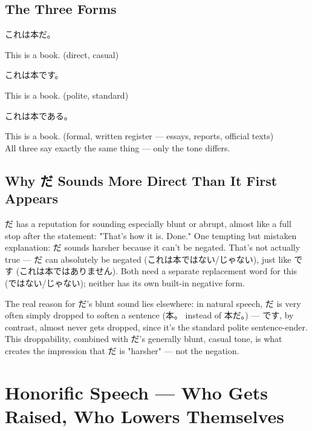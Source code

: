 \documentclass[12pt]{book}
\begin{document}
\section*{The Three Forms}

\par\quad これは本だ。\\
\par\quad This is a book. (direct, casual)\\

\par\quad これは本です。\\
\par\quad This is a book. (polite, standard)\\

\par\quad これは本である。\\
\par\quad This is a book. (formal, written register — essays, reports, official texts)\\

All three say exactly the same thing — only the tone differs.

\section*{Why だ Sounds More Direct Than It First Appears}

だ has a reputation for sounding especially blunt or abrupt, almost like a full stop after the statement: "That's how it is. Done." One tempting but mistaken explanation: だ sounds harsher because it can't be negated. That's not actually true — だ can absolutely be negated (これは本ではない/じゃない), just like です (これは本ではありません). Both need a separate replacement word for this (ではない/じゃない); neither has its own built-in negative form.

The real reason for だ's blunt sound lies elsewhere: in natural speech, だ is very often simply dropped to soften a sentence (本。 instead of 本だ。) — です, by contrast, almost never gets dropped, since it's the standard polite sentence-ender. This droppability, combined with だ's generally blunt, casual tone, is what creates the impression that だ is "harsher" — not the negation.


\chapter{Honorific Speech — Who Gets Raised, Who Lowers Themselves}
\end{document}
